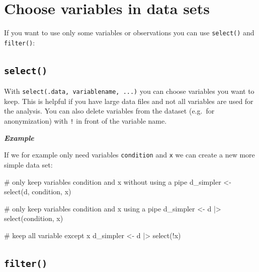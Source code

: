 \documentclass[
  letterpaper,
  DIV=11,
  numbers=noendperiod,
  oneside]{scrreprt}
\newenvironment{Shaded}{\begin{snugshade}}{\end{snugshade}}
\newcommand{\CommentTok}[1]{\textcolor[rgb]{0.37,0.37,0.37}{#1}}
\newcommand{\FunctionTok}[1]{\textcolor[rgb]{0.28,0.35,0.67}{#1}}
\newcommand{\NormalTok}[1]{\textcolor[rgb]{0.00,0.23,0.31}{#1}}
\newcommand{\OtherTok}[1]{\textcolor[rgb]{0.00,0.23,0.31}{#1}}
\newcommand{\SpecialCharTok}[1]{\textcolor[rgb]{0.37,0.37,0.37}{#1}}
\begin{document}
\hfill\break

\hypertarget{choose-variables-in-data-sets}{%
\section{Choose variables in data
sets}\label{choose-variables-in-data-sets}}

If you want to use only some variables or observations you can use
\texttt{select()} and \texttt{filter()}:

\hypertarget{select}{%
\subsection{\texorpdfstring{\texttt{select()}}{select()}}\label{select}}

With \texttt{select(.data,\ variablename,\ ...)} you can choose
variables you want to keep. This is helpful if you have large data files
and not all variables are used for the analysis. You can also delete
variables from the dataset (e.g.~for anonymization) with \texttt{!} in
front of the variable name.

\textbf{\emph{Example}}

If we for example only need variables \texttt{condition} and \texttt{x}
we can create a new more simple data set:

\begin{Shaded}
\begin{Highlighting}[]
\CommentTok{\# only keep variables condition and x without using a pipe}
\NormalTok{d\_simpler }\OtherTok{\textless{}{-}} \FunctionTok{select}\NormalTok{(d, condition, x)}

\CommentTok{\# only keep variables condition and x using a pipe}
\NormalTok{d\_simpler }\OtherTok{\textless{}{-}}\NormalTok{ d }\SpecialCharTok{|\textgreater{}} \FunctionTok{select}\NormalTok{(condition, x)}

\CommentTok{\# keep all variable except x}
\NormalTok{d\_simpler }\OtherTok{\textless{}{-}}\NormalTok{ d }\SpecialCharTok{|\textgreater{}} \FunctionTok{select}\NormalTok{(}\SpecialCharTok{!}\NormalTok{x)}
\end{Highlighting}
\end{Shaded}

\hypertarget{filter}{%
\subsection{\texorpdfstring{\texttt{filter()}}{filter()}}\label{filter}}
\end{document}
